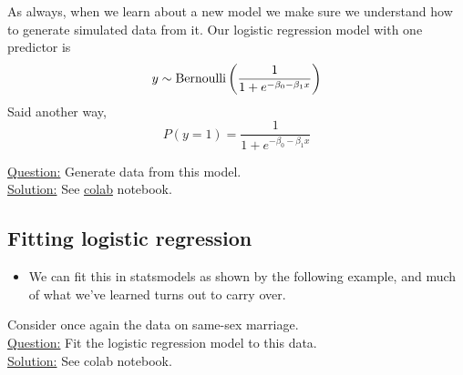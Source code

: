 \begin{itemize}
%

\begin{example}
As always, when we learn about a new model we make sure we understand how to generate simulated data from it. Our logistic regression model with one predictor is 
\begin{equation*}
y \sim {\rm Bernoulli}\left( \frac{1}{1 + e^{-\beta_0 - \beta_1 x}} \right)
\end{equation*}
Said another way, 
\begin{equation*}
P(y=1) =  \frac{1}{1 + e^{-\beta_0- \beta_1 x}}
\end{equation*}


\noindent
\underline{Question:} Generate data from this model.\\

\noindent
\underline{Solution:} See \href{https://colab.research.google.com/drive/1_oMrxtIlJ-EdW1ozmlydx0A9qrA-sVKm?usp=sharing}{colab} notebook. 

\end{example}
\end{itemize}



\subsection{Fitting logistic regression}
\begin{itemize}
\item We can fit this in statsmodels as shown by the following example, and much of what we've learned turns out to carry over. 
\end{itemize}



\begin{example}
Consider once again the data on same-sex marriage. \\

\noindent
\underline{Question:} Fit the logistic regression model to this data. \\

\noindent
\underline{Solution:} See colab notebook. 


\end{example}




